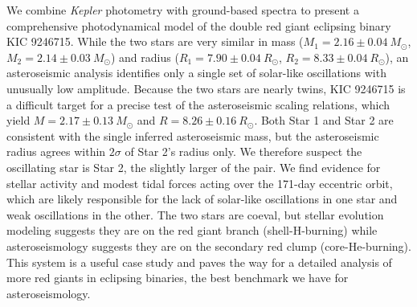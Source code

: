 We combine \emph{Kepler} photometry with ground-based spectra to present a comprehensive photodynamical model of the double red giant eclipsing binary KIC 9246715. While the two stars are very similar in mass ($M_1 = 2.16 \pm 0.04\ M_{\odot}$, $M_2 = 2.14 \pm 0.03\ M_{\odot}$) and radius ($R_1 = 7.90 \pm 0.04 \ R_{\odot}$, $R_2 = 8.33 \pm 0.04 \ R_{\odot}$), an asteroseismic analysis identifies only a single set of solar-like oscillations with unusually low amplitude. Because the two stars are nearly twins, KIC 9246715 is a difficult target for a precise test of the asteroseismic scaling relations, which yield $M = 2.17 \pm 0.13 \ M_{\odot}$ and $R = 8.26 \pm 0.16 \ R_{\odot}$. Both Star 1 and Star 2 are consistent with the single inferred asteroseismic mass, but the asteroseismic radius agrees within $2 \sigma$ of Star 2's radius only. We therefore suspect the oscillating star is Star 2, the slightly larger of the pair. We find evidence for stellar activity and modest tidal forces acting over the 171-day eccentric orbit, which are likely responsible for the lack of solar-like oscillations in one star and weak oscillations in the other. The two stars are coeval, but stellar evolution modeling suggests they are on the red giant branch (shell-H-burning) while asteroseismology suggests they are on the secondary red clump (core-He-burning). This system is a useful case study and paves the way for a detailed analysis of more red giants in eclipsing binaries, the best benchmark we have for asteroseismology.

  